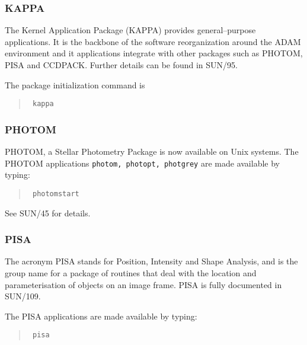 \subsubsection{KAPPA}

The Kernel Application Package (KAPPA) provides general--purpose applications.
It is the backbone of the software reorganization around the ADAM environment
and it applications integrate with other packages such as PHOTOM, PISA and
CCDPACK. 
Further details can be found in SUN/95.

The package initialization command is 

\begin{quote}\tt
kappa
\end{quote}


\subsubsection{PHOTOM}

PHOTOM, a Stellar Photometry Package is now available on Unix systems.
The PHOTOM applications {\tt photom, photopt, photgrey} are made available 
by typing:
\begin{quote}\tt
photomstart
\end{quote}
See SUN/45 for details.

\subsubsection{PISA}

The acronym PISA stands for Position, Intensity and Shape Analysis, and is
the group name for a package of routines that deal with the location and
parameterisation of objects on an image frame.
PISA is fully documented in SUN/109. 

The PISA applications are made available 
by typing:
\begin{quote}\tt
pisa
\end{quote}

